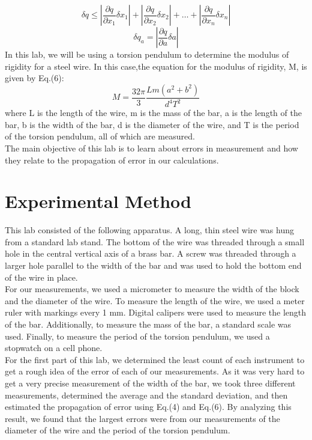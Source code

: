 \documentclass[leqno]{article}
\begin{document}
\begin{equation}
	\delta q \leq |\frac{\partial q}{\partial x_1}\delta x_1|+|\frac{\partial q}{\partial x_2}\delta x_2|+\ldots + |\frac{\partial q}{\partial x_n}\delta x_n|
\end{equation}
\begin{equation}
	\delta q_a=|\frac{\partial q}{\partial a}\delta a|
\end{equation}
In this lab, we will be using a torsion pendulum to determine the modulus of rigidity for a steel wire.
In this case,the equation for the modulus of rigidity, M, is given by Eq.(6):
\begin{equation}
	M=\frac{32\pi}{3}\frac{Lm(a^2+b^2)}{d^4T^2}
\end{equation}
where L is the length of the wire, m is the mass of the bar, a is the length of the bar, b is the width of the bar, d is the diameter of the wire, and T is the period of the torsion pendulum, all of which are measured.\\
The main objective of this lab is to learn about errors in measurement and how they relate to the propagation of error in our calculations.
\section*{Experimental Method}
This lab consisted of the following apparatus.  A long, thin steel wire was hung from a standard lab stand.  The bottom of the wire was threaded through a small hole in the central vertical axis of a brass bar.  A screw was threaded through a larger hole parallel to the width of the bar and was used to hold the bottom end of the wire in place.\\

For our measurements, we used a micrometer to measure the width of the block and the diameter of the wire.  To measure the length of the wire, we used a meter ruler with markings every 1 mm.  Digital calipers were used to measure the length of the bar.  Additionally, to measure the mass of the bar, a standard scale was used.  Finally, to measure the period of the torsion pendulum, we used a stopwatch on a cell phone.\\

For the first part of this lab, we determined the least count of each instrument to get a rough idea of the error of each of our measurements.  As it was very hard to get a very precise measurement of the width of the bar, we took three different measurements, determined the average and the standard deviation, and then estimated the propagation of error using Eq.(4) and Eq.(6).  By analyzing this result, we found that the largest errors were from our measurements of the diameter of the wire and the period of the torsion pendulum.\\
\end{document}
